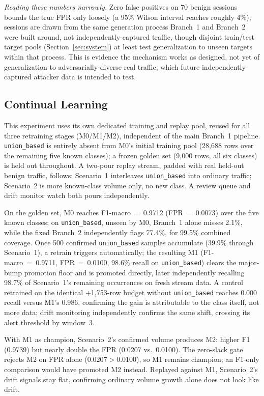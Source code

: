 \documentclass[conference]{IEEEtran}
\begin{document}
\emph{Reading these numbers narrowly.} Zero false positives on 70 benign sessions bounds the true FPR only loosely (a 95\% Wilson interval reaches roughly 4\%); sessions are drawn from the same generation process Branch~1 and Branch~2 were built around, not independently-captured traffic, though disjoint train/test target pools (Section~\ref{sec:system}) at least test generalization to unseen targets within that process. This is evidence the mechanism works as designed, not yet of generalization to adversarially-diverse real traffic, which future independently-captured attacker data is intended to test.

\subsection{Continual Learning}
This experiment uses its own dedicated training and replay pool, reused for all three retraining stages (M0/M1/M2), independent of the main Branch~1 pipeline. \texttt{union\_based} is entirely absent from M0's initial training pool (28{,}688 rows over the remaining five known classes); a frozen golden set (9{,}000 rows, all six classes) is held out throughout. A two-pour replay stream, padded with real held-out benign traffic, follows: Scenario~1 interleaves \texttt{union\_based} into ordinary traffic; Scenario~2 is more known-class volume only, no new class. A review queue and drift monitor watch both pours independently.

On the golden set, M0 reaches F1-macro~=~0.9712 (FPR~=~0.0073) over the five known classes; on \texttt{union\_based}, unseen by M0, Branch~1 alone misses 2.1\%, while the fixed Branch~2 independently flags 77.4\%, for 99.5\% combined coverage. Once 500 confirmed \texttt{union\_based} samples accumulate (39.9\% through Scenario~1), a retrain triggers automatically; the resulting M1 (F1-macro~=~0.9711, FPR~=~0.0100, 98.6\% recall on \texttt{union\_based}) clears the major-bump promotion floor and is promoted directly, later independently recalling 98.7\% of Scenario~1's remaining occurrences on fresh stream data. A control retrained on the identical +1{,}753-row budget without \texttt{union\_based} reaches 0.000 recall versus M1's 0.986, confirming the gain is attributable to the class itself, not more data; drift monitoring independently confirms the same shift, crossing its alert threshold by window~3.

With M1 as champion, Scenario~2's confirmed volume produces M2: higher F1 (0.9739) but nearly double the FPR (0.0207 vs.\ 0.0100). The zero-slack gate rejects M2 on FPR alone ($0.0207 > 0.0100$), so M1 remains champion; an F1-only comparison would have promoted M2 instead. Replayed against M1, Scenario~2's drift signals stay flat, confirming ordinary volume growth alone does not look like drift.
\end{document}

